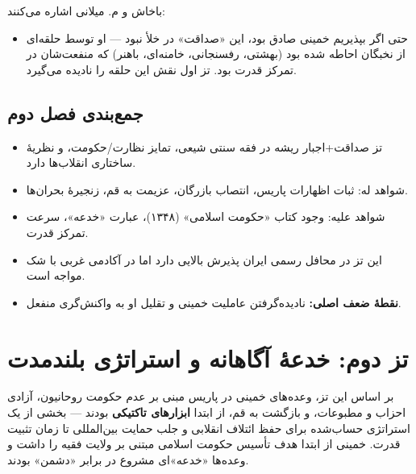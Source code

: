 \documentclass[12pt,a4paper]{book}
\newcommand{\keyword}[1]{\textbf{\textcolor{cPrimary}{#1}}}
\begin{document}
باخاش و م. میلانی اشاره می‌کنند:

\begin{itemize}[label=\textcolor{cConsolid}{$\times$}, rightmargin=2em]
    \item حتی اگر بپذیریم خمینی صادق بود، این «صداقت» در خلأ نبود — او توسط حلقه‌ای از نخبگان احاطه شده بود (بهشتی، رفسنجانی، خامنه‌ای، باهنر) که منفعت‌شان در تمرکز قدرت بود. تز اول نقش این حلقه را نادیده می‌گیرد.
\end{itemize}

\section{جمع‌بندی فصل دوم}

\begin{principleBox}
\begin{itemize}[label=\textcolor{cPrimary}{$\blacksquare$}, rightmargin=2em]
    \item تز صداقت+اجبار ریشه در فقه سنتی شیعی، تمایز نظارت/حکومت، و نظریهٔ ساختاری انقلاب‌ها دارد.
    \item شواهد له: ثبات اظهارات پاریس، انتصاب بازرگان، عزیمت به قم، زنجیرهٔ بحران‌ها.
    \item شواهد علیه: وجود کتاب «حکومت اسلامی» (۱۳۴۸)، عبارت «خدعه»، سرعت تمرکز قدرت.
    \item این تز در محافل رسمی ایران پذیرش بالایی دارد اما در آکادمی غربی با شک مواجه است.
    \item \keyword{نقطهٔ ضعف اصلی:} نادیده‌گرفتن عاملیت خمینی و تقلیل او به واکنش‌گری منفعل.
\end{itemize}
\end{principleBox}


\chapter{تز دوم: خدعهٔ آگاهانه و استراتژی بلندمدت}

\begin{infoBox}
بر اساس این تز، وعده‌های خمینی در پاریس مبنی بر عدم حکومت روحانیون، آزادی احزاب و مطبوعات، و بازگشت به قم، از ابتدا \keyword{ابزارهای تاکتیکی} بودند — بخشی از یک استراتژی حساب‌شده برای حفظ ائتلاف انقلابی و جلب حمایت بین‌المللی تا زمان تثبیت قدرت. خمینی از ابتدا هدف تأسیس حکومت اسلامی مبتنی بر ولایت فقیه را داشت و وعده‌ها «خدعه»ای مشروع در برابر «دشمن» بودند.
\end{infoBox}
\end{document}
